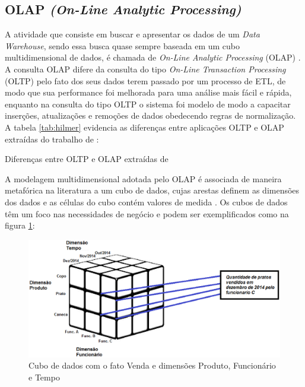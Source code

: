 \subsection{OLAP \textit{(On-Line Analytic Processing)}}

A atividade que consiste em buscar e apresentar os dados de um \textit{Data Warehouse}, sendo essa busca quase sempre baseada em um cubo multidimensional de dados, é chamada de \textit{On-Line Analytic Processing} (OLAP) \cite{Kimball2002}. A consulta OLAP difere da consulta do tipo \textit{On-Line Transaction Processing} (OLTP) pelo fato dos seus dados terem passado por um processo de ETL, de modo que sua performance foi melhorada para uma análise mais fácil e rápida, enquanto na consulta do tipo OLTP o sistema foi modelo de modo a capacitar inserções, atualizações e remoções de dados obedecendo regras de normalização. A tabela \ref{tab:hilmer} evidencia as diferenças entre aplicações OLTP e OLAP extraídas do trabalho de : 

\begin{table}[!ht]
	\begin{center}
	
	 
	\caption{Diferenças entre OLTP e OLAP extraídas de }
	\label{tab:hilmer}
	\end{center}
	\end{table}	
	\FloatBarrier	

A modelagem multidimensional adotada pelo OLAP é associada de maneira metafórica na literatura a um cubo de dados, cujas arestas definem as dimensões dos dados e as células do cubo contém valores de medida \cite{Kimball2002}. Os cubos de dados têm um foco nas necessidades de negócio e podem ser exemplificados como na figura \ref{fig:cubo}:

\begin{figure}[h!]
\centering
\includegraphics[keepaspectratio=false,scale=0.50]{figuras/figuras_matheus/cubo.eps}
\caption{Cubo de dados com o fato Venda e dimensões Produto, Funcionário e Tempo}
\label{fig:cubo}
\end{figure}
\FloatBarrier

